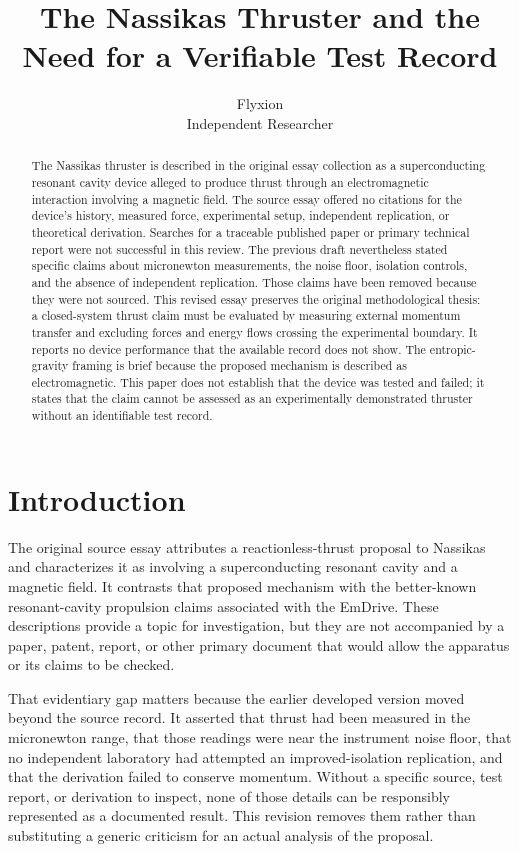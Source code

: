 \documentclass[11pt]{article}
\title{The Nassikas Thruster and the Need for a Verifiable Test Record}
\author{Flyxion \\ \small Independent Researcher}
\date{}
\begin{document}
\maketitle

\begin{abstract}
The Nassikas thruster is described in the original essay collection as a superconducting resonant cavity device alleged to produce thrust through an electromagnetic interaction involving a magnetic field. The source essay offered no citations for the device's history, measured force, experimental setup, independent replication, or theoretical derivation. Searches for a traceable published paper or primary technical report were not successful in this review. The previous draft nevertheless stated specific claims about micronewton measurements, the noise floor, isolation controls, and the absence of independent replication. Those claims have been removed because they were not sourced. This revised essay preserves the original methodological thesis: a closed-system thrust claim must be evaluated by measuring external momentum transfer and excluding forces and energy flows crossing the experimental boundary. It reports no device performance that the available record does not show. The entropic-gravity framing is brief because the proposed mechanism is described as electromagnetic. This paper does not establish that the device was tested and failed; it states that the claim cannot be assessed as an experimentally demonstrated thruster without an identifiable test record.
\end{abstract}

\section{Introduction}

The original source essay attributes a reactionless-thrust proposal to Nassikas and characterizes it as involving a superconducting resonant cavity and a magnetic field. It contrasts that proposed mechanism with the better-known resonant-cavity propulsion claims associated with the EmDrive. These descriptions provide a topic for investigation, but they are not accompanied by a paper, patent, report, or other primary document that would allow the apparatus or its claims to be checked.

That evidentiary gap matters because the earlier developed version moved beyond the source record. It asserted that thrust had been measured in the micronewton range, that those readings were near the instrument noise floor, that no independent laboratory had attempted an improved-isolation replication, and that the derivation failed to conserve momentum. Without a specific source, test report, or derivation to inspect, none of those details can be responsibly represented as a documented result. This revision removes them rather than substituting a generic criticism for an actual analysis of the proposal.
\end{document}
